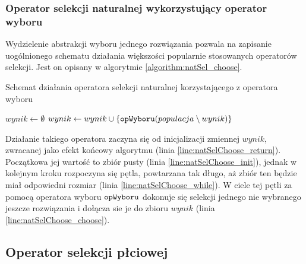 \documentclass[./FM_mgr.tex]{subfiles}
\begin{document}
\subsubsection{Operator selekcji naturalnej wykorzystujący operator wyboru}

Wydzielenie abstrakcji wyboru jednego rozwiązania pozwala na zapisanie uogólnionego schematu działania większości popularnie stosowanych operatorów selekcji.
Jest on opisany w algorytmie \ref{algorithm:natSel_choose}.

\begin{algorithm}[h]
	\caption{Schemat działania operatora selekcji naturalnej korzystającego z operatora wyboru \label{algorithm:natSel_choose}}
	\begin{algorithmic}[1]
		\Start
		\Var $wynik \gets \emptyset$ 
		\label{line:natSelChoose_init}
		\label{line:natSelChoose_while}
		\State $wynik \gets wynik \cup \{ \mathtt{opWyboru}(populacja \setminus wynik) \}$
		\label{line:natSelChoose_choose}
		\EndWhile
		\State {}
		\label{line:natSelChoose_return}
		\EndOperator
	\end{algorithmic}
\end{algorithm}

Działanie takiego operatora zaczyna się od inicjalizacji zmiennej $wynik$, zwracanej jako efekt końcowy algorytmu (linia \ref{line:natSelChoose_return}). 
Początkowa jej wartość to zbiór pusty (linia \ref{line:natSelChoose_init}), jednak w kolejnym kroku rozpoczyna się pętla, powtarzana tak długo, aż zbiór ten będzie miał odpowiedni rozmiar (linia \ref{line:natSelChoose_while}).
W ciele tej pętli za pomocą operatora wyboru $\mathtt{opWyboru}$ dokonuje się selekcji jednego nie wybranego jeszcze rozwiązania i dołącza sie je do zbioru $wynik$ (linia \ref{line:natSelChoose_choose}).

\subsection{Operator selekcji płciowej} \label{subsection:new_genSel}
\end{document}
